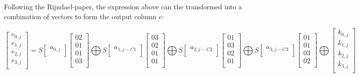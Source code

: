 \documentclass{article}
\begin{document}
Following the Rijndael-paper, the expression above can the transformed into a combination of vectors to form the output column $e$:

\[
\begin{bmatrix}
e_{0,j} \\
e_{1,j} \\
e_{2,j} \\
e_{3,j} \\
\end{bmatrix}
=
S
\begin{bmatrix}
a_{0,j} \\
\end{bmatrix}
\begin{bmatrix}
02 \\
01 \\
01 \\
03 \\
\end{bmatrix}
\bigoplus
S
\begin{bmatrix}
a_{1,j-C1} \\
\end{bmatrix}
\begin{bmatrix}
03 \\
02 \\
01 \\
01 \\
\end{bmatrix}
\bigoplus
S
\begin{bmatrix}
a_{2,j-C2} \\
\end{bmatrix}
\begin{bmatrix}
01 \\
03 \\
02 \\
01 \\
\end{bmatrix}
\bigoplus
S
\begin{bmatrix}
a_{3,j-C3} \\
\end{bmatrix}
\begin{bmatrix}
01 \\
01 \\
03 \\
02 \\
\end{bmatrix}
\bigoplus
\begin{bmatrix}
k_{0,j} \\
k_{1,j} \\
k_{2,j} \\
k_{3,j} \\
\end{bmatrix}
\]
\end{document}
